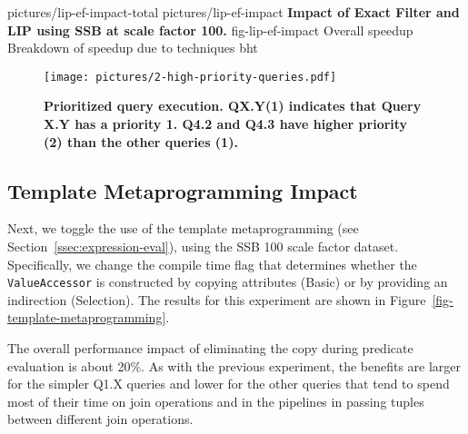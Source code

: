 
\twoabfigures
{pictures/lip-ef-impact-total}
{pictures/lip-ef-impact}
{\textbf{Impact of Exact Filter and LIP using SSB at scale factor 100.}}
{fig-lip-ef-impact}
{Overall speedup}
{Breakdown of speedup due to techniques}
{bht}

\begin{figure*}[htb]
   \vspace*{3em}
  \centering
   \texttt{[image: pictures/2-high-priority-queries.pdf]}
   \caption{\textbf{Prioritized query execution. QX.Y(1) indicates that Query X.Y has a priority 1. Q4.2 and Q4.3 have higher priority (2) than the other queries (1).}}
   \label{fig-high-priority}
\end{figure*}

\subsection{Template Metaprogramming Impact}
\label{sec:expt:vectorization}

Next, we toggle the use of the template metaprogramming (see Section~\ref{ssec:expression-eval}), using the SSB 100 scale factor dataset. Specifically, we change the compile time flag that determines whether the \texttt{ValueAccessor} is constructed by copying attributes (Basic) or by providing an indirection (Selection). The results for this experiment are shown in Figure~\ref{fig-template-metaprogramming}.

The overall performance impact of eliminating the copy during predicate evaluation is about 20\%. As with the previous experiment, the benefits are larger for the simpler Q1.X queries and lower for the other queries that tend to spend most of their time on join operations and in the pipelines in passing tuples between different join operations.

